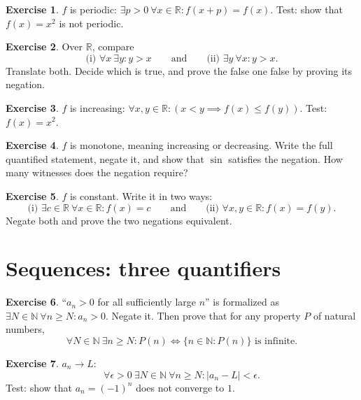 \documentclass{workbook}
\theoremstyle{definition}
\newtheorem{exercise}{Exercise}[section]
\newcommand{\N}{\mathbb{N}}
\newcommand{\R}{\mathbb{R}}
\begin{document}
\begin{exercise}\label{ex:periodic}
$f$ is periodic: $\exists p > 0\ \forall x \in \R : f(x + p) = f(x)$. Test: show that $f(x) = x^2$ is not periodic.
\end{exercise}

\begin{exercise}\label{ex:swap1}
Over $\R$, compare
\[
  \text{(i) } \forall x\ \exists y : y > x
  \qquad\text{and}\qquad
  \text{(ii) } \exists y\ \forall x : y > x.
\]
Translate both. Decide which is true, and prove the false one false by proving its negation.
\end{exercise}

\begin{exercise}\label{ex:incr}
$f$ is increasing: $\forall x, y \in \R : (x < y \implies f(x) \le f(y))$. Test: $f(x) = x^2$.
\end{exercise}

\begin{exercise}\label{ex:monotone}
$f$ is monotone, meaning increasing or decreasing. Write the full quantified statement, negate it, and show that $\sin$ satisfies the negation. How many witnesses does the negation require?
\end{exercise}

\begin{exercise}\label{ex:const}
$f$ is constant. Write it in two ways:
\[
  \text{(i) } \exists c \in \R\ \forall x \in \R : f(x) = c
  \qquad\text{and}\qquad
  \text{(ii) } \forall x, y \in \R : f(x) = f(y).
\]
Negate both and prove the two negations equivalent.
\end{exercise}

\section{Sequences: three quantifiers}

\begin{exercise}\label{ex:eventually}
``$a_n > 0$ for all sufficiently large $n$'' is formalized as $\exists N \in \N\ \forall n \ge N : a_n > 0$. Negate it. Then prove that for any property $P$ of natural numbers,
\[
  \forall N \in \N\ \exists n \ge N : P(n)
  \iff
  \{ n \in \N : P(n) \} \text{ is infinite.}
\]
\end{exercise}

\begin{exercise}\label{ex:conv}
$a_n \to L$:
\[
  \forall \epsilon > 0\ \exists N \in \N\ \forall n \ge N : |a_n - L| < \epsilon.
\]
Test: show that $a_n = (-1)^n$ does not converge to $1$.
\end{exercise}
\end{document}
